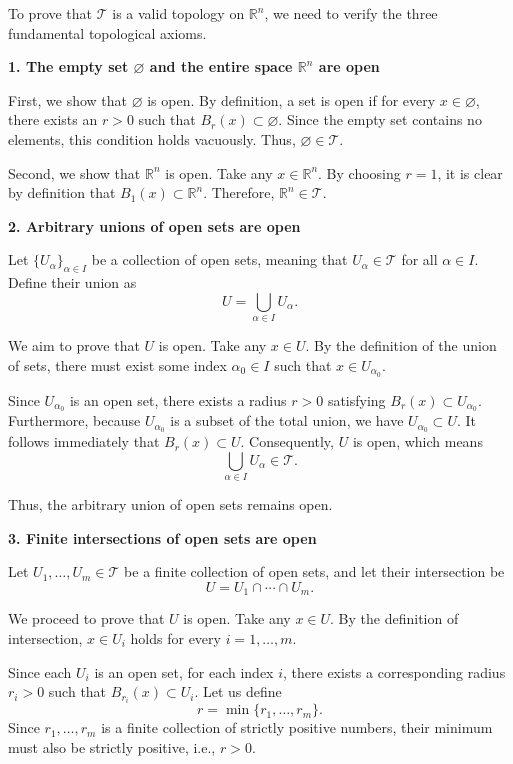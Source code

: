 \documentclass[UTF8,12pt,a4paper]{ctexart}
\makeatletter
\numberwithin{equation}{section}
\newcommand{\currentProofColor}{black}
\renewenvironment{proof}[1][Proof]{%
  \par
  \begingroup
  \edef\proofQEDColor{\currentProofColor}%
  \renewcommand{\qedsymbol}{\textcolor{\proofQEDColor}{$\blacksquare$}}%
  \pushQED{\qed}%
  \normalfont
  \topsep6\p@\@plus6\p@\relax
  \trivlist
  \item[\hskip\labelsep\bfseries\itshape #1\@addpunct{.}]\ignorespaces
}{%
  \popQED
  \endtrivlist
  \@endpefalse
  \endgroup
}
\makeatother
\begin{document}
\begin{proof}
To prove that $\mathcal{T}$ is a valid topology on $\mathbb{R}^n$, we need to verify the three fundamental topological axioms.

\medskip
\noindent \textbf{1. The empty set $\varnothing$ and the entire space $\mathbb{R}^n$ are open}

First, we show that $\varnothing$ is open. By definition, a set is open if for every $x \in \varnothing$, there exists an $r > 0$ such that $B_r(x) \subset \varnothing$. Since the empty set contains no elements, this condition holds vacuously. Thus, $\varnothing \in \mathcal{T}$.

Second, we show that $\mathbb{R}^n$ is open. Take any $x \in \mathbb{R}^n$. By choosing $r = 1$, it is clear by definition that $B_1(x) \subset \mathbb{R}^n$. Therefore, $\mathbb{R}^n \in \mathcal{T}$.

\medskip
\noindent \textbf{2. Arbitrary unions of open sets are open}

Let $\{U_\alpha\}_{\alpha \in I}$ be a collection of open sets, meaning that $U_\alpha \in \mathcal{T}$ for all $\alpha \in I$. Define their union as
$$
U = \bigcup_{\alpha \in I} U_\alpha.
$$

We aim to prove that $U$ is open. Take any $x \in U$. By the definition of the union of sets, there must exist some index $\alpha_0 \in I$ such that $x \in U_{\alpha_0}$. 

Since $U_{\alpha_0}$ is an open set, there exists a radius $r > 0$ satisfying $B_r(x) \subset U_{\alpha_0}$. Furthermore, because $U_{\alpha_0}$ is a subset of the total union, we have $U_{\alpha_0} \subset U$. It follows immediately that $B_r(x) \subset U$. Consequently, $U$ is open, which means
$$
\bigcup_{\alpha \in I} U_\alpha \in \mathcal{T}.
$$

Thus, the arbitrary union of open sets remains open.

\medskip
\noindent \textbf{3. Finite intersections of open sets are open}

Let $U_1, \dots, U_m \in \mathcal{T}$ be a finite collection of open sets, and let their intersection be
$$
U = U_1 \cap \cdots \cap U_m.
$$

We proceed to prove that $U$ is open. Take any $x \in U$. By the definition of intersection, $x \in U_i$ holds for every $i = 1, \dots, m$.

Since each $U_i$ is an open set, for each index $i$, there exists a corresponding radius $r_i > 0$ such that $B_{r_i}(x) \subset U_i$. Let us define
$$
r = \min\{r_1, \dots, r_m\}.
$$
Since $r_1, \dots, r_m$ is a finite collection of strictly positive numbers, their minimum must also be strictly positive, i.e., $r > 0$. 


\end{proof}
\end{document}
